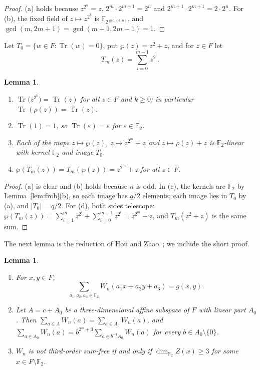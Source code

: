 \documentclass[11pt]{amsart}
\newtheorem{lemma}[theorem]{Lemma}
\theoremstyle{definition}
\theoremstyle{remark}
\numberwithin{equation}{section}
\newcommand{\F}{\mathbb{F}}
\newcommand{\Tr}{\operatorname{Tr}}
\begin{document}
\begin{proof}
(a) holds because $z^{2^n}=z$, $2^m\cdot2^{m+1}=2^n$ and $2^{m+1}\cdot2^{m+1}=2\cdot2^n$. For (b), the fixed field of $z\mapsto z^{2^k}$ is $\F_{2^{\gcd(k,n)}}$, and $\gcd(m,2m+1)=\gcd(m+1,2m+1)=1$.
\end{proof}

Let $T_0=\{w\in F:\Tr(w)=0\}$, put $\wp(z)=z^2+z$, and for $z\in F$ let
\[
T_m(z)=\sum_{i=0}^{m-1}z^{2^i}.
\]

\begin{lemma}\label{lem:trace}
\begin{enumerate}
\item[(a)] $\Tr\bigl(z^{2^k}\bigr)=\Tr(z)$ for all $z\in F$ and $k\ge0$; in particular $\Tr(\rho(z))=\Tr(z)$.
\item[(b)] $\Tr(1)=1$, so $\Tr(\varepsilon)=\varepsilon$ for $\varepsilon\in\F_2$.
\item[(c)] Each of the maps $z\mapsto\wp(z)$, $z\mapsto z^{2^m}+z$ and $z\mapsto\rho(z)+z$ is $\F_2$-linear with kernel $\F_2$ and image $T_0$.
\item[(d)] $\wp(T_m(z))=T_m(\wp(z))=z^{2^m}+z$ for all $z\in F$.
\end{enumerate}
\end{lemma}

\begin{proof}
(a) is clear and (b) holds because $n$ is odd. In (c), the kernels are $\F_2$ by Lemma~\ref{lem:frob}(b), so each image has $q/2$ elements; each image lies in $T_0$ by (a), and $|T_0|=q/2$. For (d), both sides telescope: $\wp(T_m(z))=\sum_{i=1}^{m}z^{2^i}+\sum_{i=0}^{m-1}z^{2^i}=z^{2^m}+z$, and $T_m(z^2+z)$ is the same sum.
\end{proof}

The next lemma is the reduction of Hou and Zhao~\cite[Section~4]{HZ}; we include the short proof.

\begin{lemma}\label{lem:reduction}
\begin{enumerate}
\item[(a)] For $x,y\in F$,
\[
\sum_{a_1,a_2,a_3\in\F_2}W_n(a_1x+a_2y+a_3)=g(x,y).
\]
\item[(b)] Let $A=c+A_0$ be a three-dimensional affine subspace of $F$ with linear part $A_0$. Then $\sum_{a\in A}W_n(a)=\sum_{a\in A_0}W_n(a)$, and $\sum_{a\in A_0}W_n(a)=b^{2^m+3}\sum_{a\in b^{-1}A_0}W_n(a)$ for every $b\in A_0\setminus\{0\}$.
\item[(c)] $W_n$ is not third-order sum-free if and only if $\dim_{\F_2}Z(x)\ge3$ for some $x\in F\setminus\F_2$.
\end{enumerate}
\end{lemma}
\end{document}

